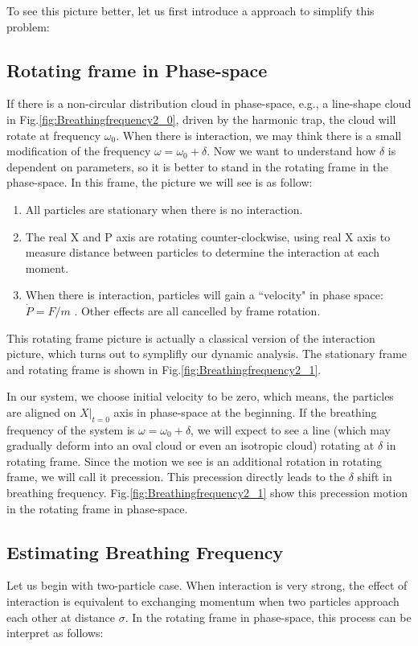 \documentclass[aps,preprintnumbers,onecolumn,amsmath,amssymb,floatfix,pra]{revtex4-1}
\begin{document}
To see this picture better, let us first introduce a approach to simplify this problem:

\subsection{Rotating frame in Phase-space}
If there is a non-circular distribution cloud in phase-space, e.g., a line-shape cloud in
Fig.\ref{fig:Breathingfrequency2_0}, driven by the harmonic trap, the cloud will rotate at frequency
$\omega_0$. When there is interaction, we may think there is a small modification of the frequency
$\omega=\omega_0+\delta$. Now we want to understand how $\delta$ is dependent on parameters, so it
is better to stand in the rotating frame in the phase-space. In this frame, the picture we will see
is as follow:\\
\begin{enumerate}[\textbf{*}]
\item All particles are stationary when there is no interaction.
\item The real X and P axis are rotating counter-clockwise, using real X axis to measure distance between particles to determine the interaction at each moment.
\item When there is interaction, particles will gain a ``velocity" in phase space: $\dot{P}=F/m$ . Other effects are all cancelled by frame rotation.
\end{enumerate}


This rotating frame picture is actually a classical version of the interaction picture, which turns out to symplifly our dynamic analysis. The stationary frame and rotating frame is shown in Fig.\ref{fig:Breathingfrequency2_1}.

In our system, we choose initial velocity to be zero, which means, the particles are aligned on $X|_{t=0}$ axis in phase-space at the beginning. If the breathing frequency of the system is $\omega=\omega_0+\delta$, we will expect to see a line (which may gradually deform into an oval cloud or even an isotropic cloud) rotating at $\delta$ in rotating frame. Since the motion we see is an additional rotation in rotating frame, we will call it precession. This precession directly leads to the $\delta$ shift in breathing frequency. Fig.\ref{fig:Breathingfrequency2_1} show this precession motion in the rotating frame in phase-space.





\subsection{Estimating Breathing Frequency}
Let us begin with two-particle case. When interaction is very strong, the effect of interaction is equivalent to exchanging momentum when two particles approach each other at distance $\sigma$. In the rotating frame in phase-space, this process can be interpret as follows:
\end{document}
